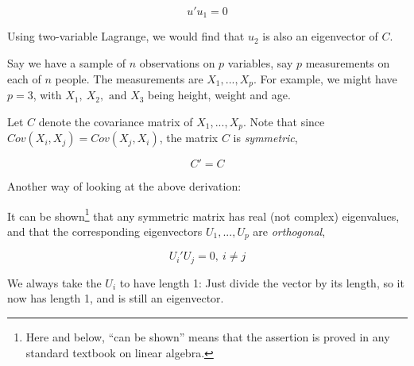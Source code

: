 \begin{equation}
u'u_1 = 0
\end{equation}

Using two-variable Lagrange, we would find that $u_2$ is also an
eigenvector of $C$.

Say we have a sample of $n$ observations on $p$ variables, say $p$
measurements on each of $n$ people.  The measurements are $X_1,...,X_p$.
For example, we might have $p=3$, with $X_1, ~ X_2, \textrm{ and } X_3$
being height, weight and age.  

% 
% 
% 

Let $C$ denote the covariance matrix of $X_1,...,X_p$.  Note that
since $Cov(X_i,X_j) = Cov(X_j,X_i)$, 
the matrix $C$ is \emph{symmetric},

\begin{equation}
C' = C
\end{equation}

% 
% 

Another way of looking at the above derivation:

It can be shown\footnote{Here and below, ``can be shown'' means that the
assertion is proved in any standard textbook on linear algebra.} that
any symmetric matrix has real (not complex) eigenvalues, and that the
corresponding eigenvectors $U_1,...,U_p$ are \textit{orthogonal},

\begin{equation}
U_i' U_j = 0, ~ i \neq j
\end{equation}

We always take the $U_i$ to have length 1:  Just divide the vector by
its length, so it now has length 1, and is still an eigenvector.  

